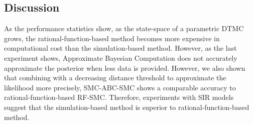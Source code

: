 \subsection{Discussion}
As the performance statistics show, as the state-space of a parametric DTMC grows, the
rational-function-based method becomes more expensive in computational cost than the
simulation-based method. However, as the last experiment shows, Approximate Bayesian Computation
does not accurately approximate the posterior when less data is provided. However, we also shown
that combining with a decreasing distance threshold to approximate the likelihood more precisely,
SMC-ABC-SMC shows a comparable accuracy to rational-function-based RF-SMC. Therefore, experiments
with SIR models suggest that the simulation-based method is superior to rational-function-based
method.



